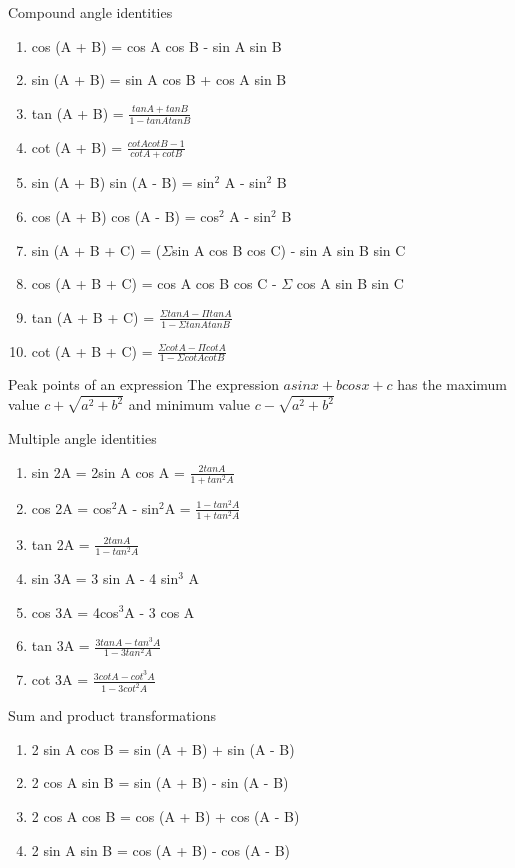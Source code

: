 \documentclass[titlepage, 12pt]{book}
\begin{document}
\begin{theorem}{Compound angle identities}{}
    \begin{enumerate}
        \item cos (A + B) = cos A cos B - sin A sin B
        \item sin (A + B) = sin A cos B + cos A sin B
        \item tan (A + B) = $\frac{tan A + tan B}{1 - tan A tan B}$
        \item cot (A + B) = $\frac{cot A cot B - 1}{cot A + cot B}$
        \item sin (A + B) sin (A - B) = sin$^2$ A - sin$^2$ B
        \item cos (A + B) cos (A - B) = cos$^2$ A - sin$^2$ B
        \item sin (A + B + C) = ($\Sigma$sin A cos B cos C) - sin A sin B sin C
        \item cos (A + B + C) = cos A cos B cos C - $\Sigma$ cos A sin B sin C
        \item tan (A + B + C) = $\frac{\Sigma tan A - \Pi tan A}{1 - \Sigma tan A tan B}$
        \item cot (A + B + C) = $\frac{\Sigma cot A - \Pi cot A}{1 - \Sigma cot A cot B}$
    \end{enumerate}
\end{theorem}

\begin{theorem}{Peak points of an expression}{}
    The expression $asinx + bcosx + c$ has the maximum value $c +
    \sqrt{a^2+b^2}$ and minimum value $c - \sqrt{a^2+b^2}$
\end{theorem}

\begin{theorem}{Multiple angle identities}{}
    \begin{enumerate}
        \item sin 2A = 2sin A cos A = $\frac{2tan A}{1 + tan^2A}$
        \item cos 2A = cos$^2$A - sin$^2$A = $\frac{1 - tan^2 A}{1 + tan^2A}$
        \item tan 2A = $\frac{2tanA}{1 - tan^2A}$
        \item sin 3A = 3 sin A - 4 sin$^3$ A
        \item cos 3A = 4cos$^3$A - 3 cos A
        \item tan 3A = $\frac{3tanA - tan^3A}{1 - 3 tan^2A}$
        \item cot 3A = $\frac{3cot A - cot^3 A}{1 - 3 cot^2A}$
    \end{enumerate}
\end{theorem}

\begin{theorem}{Sum and product transformations}{}
    \begin{enumerate}
        \item 2 sin A cos B = sin (A + B) + sin (A - B)
        \item 2 cos A sin B = sin (A + B) - sin (A - B)
        \item 2 cos A cos B = cos (A + B) + cos (A - B)
        \item 2 sin A sin B = cos (A + B) - cos (A - B)
    \end{enumerate}
\end{theorem}
\end{document}

